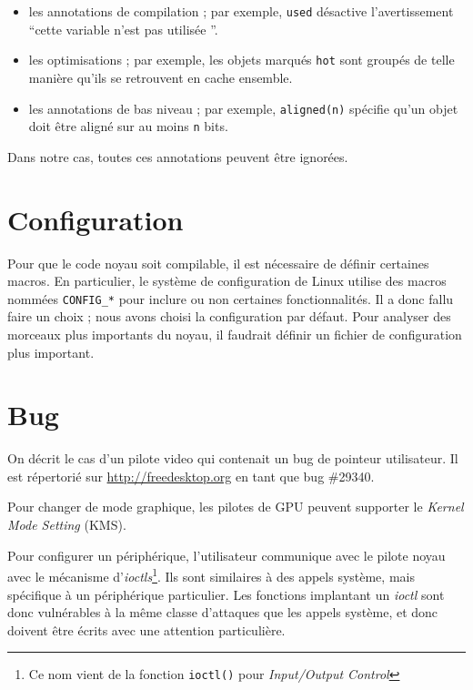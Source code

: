 \begin{itemize}
  \item les annotations de compilation ; par exemple, \texttt{used} désactive
    l'avertissement ``cette variable n'est pas utilisée ''.

  \item les optimisations ; par exemple, les objets marqués \texttt{hot} sont
    groupés de telle manière qu'ils se retrouvent en cache ensemble.

  \item les annotations de bas niveau ; par exemple, \texttt{aligned(n)}
    spécifie qu'un objet doit être aligné sur au moins \texttt{n} bits.
\end{itemize}

Dans notre cas, toutes ces annotations peuvent être ignorées.

\section{Configuration}

Pour que le code noyau soit compilable, il est nécessaire de définir certaines
macros. En particulier, le système de configuration de Linux utilise des macros
nommées \texttt{CONFIG\_*} pour inclure ou non certaines fonctionnalités. Il a
donc fallu faire un choix ; nous avons choisi la configuration par défaut. Pour
analyser des morceaux plus importants du noyau, il faudrait définir un fichier
de configuration plus important.

\section{Bug}

On décrit le cas d'un pilote video qui contenait un bug de pointeur utilisateur.
Il est répertorié sur \url{http://freedesktop.org} en tant que bug \#29340. 

Pour changer de mode graphique, les pilotes de GPU peuvent supporter le
\emph{Kernel Mode Setting} (KMS).

Pour configurer un périphérique, l'utilisateur communique avec le pilote noyau
avec le mécanisme d'\emph{ioctls}\footnote{
  Ce nom vient de la fonction \texttt{ioctl()} pour
  \emph{Input/Output Control}
}.
Ils sont similaires à des appels système, mais spécifique à un périphérique
particulier. Les fonctions implantant un \emph{ioctl} sont donc vulnérables à la
même classe d'attaques que les appels système, et donc doivent être écrits avec
une attention particulière.

